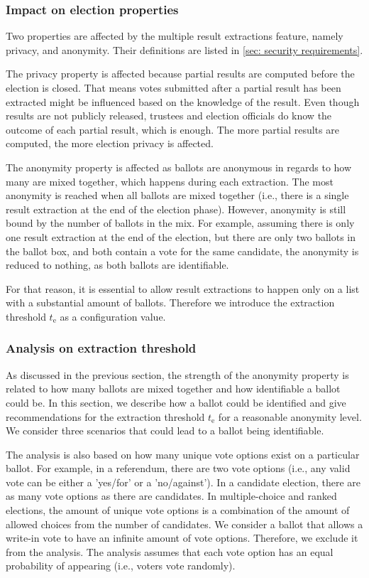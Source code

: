 \subsubsection{Impact on election properties}
Two properties are affected by the multiple result extractions feature, namely privacy, and anonymity. Their definitions are listed in \cref{sec: security requirements}.

The privacy property is affected because partial results are computed before the election is closed. That means votes submitted after a partial result has been extracted might be influenced based on the knowledge of the result. Even though results are not publicly released, trustees and election officials do know the outcome of each partial result, which is enough. The more partial results are computed, the more election privacy is affected.

The anonymity property is affected as ballots are anonymous in regards to how many are mixed together, which happens during each extraction. The most anonymity is reached when all ballots are mixed together (i.e., there is a single result extraction at the end of the election phase). However, anonymity is still bound by the number of ballots in the mix. For example, assuming there is only one result extraction at the end of the election, but there are only two ballots in the ballot box, and both contain a vote for the same candidate, the anonymity is reduced to nothing, as both ballots are identifiable.

For that reason, it is essential to allow result extractions to happen only on a list with a substantial amount of ballots. Therefore we introduce the extraction threshold $t_\mathrm{e}$ as a configuration value.


\subsubsection{Analysis on extraction threshold}
As discussed in the previous section, the strength of the anonymity property is related to how many ballots are mixed together and how identifiable a ballot could be. In this section, we describe how a ballot could be identified and give recommendations for the extraction threshold $t_\mathrm{e}$ for a reasonable anonymity level. We consider three scenarios that could lead to a ballot being identifiable.

The analysis is also based on how many unique vote options exist on a particular ballot. For example, in a referendum, there are two vote options (i.e., any valid vote can be either a 'yes/for' or a 'no/against'). In a candidate election, there are as many vote options as there are candidates. In multiple-choice and ranked elections, the amount of unique vote options is a combination of the amount of allowed choices from the number of candidates. We consider a ballot that allows a write-in vote to have an infinite amount of vote options. Therefore, we exclude it from the analysis. The analysis assumes that each vote option has an equal probability of appearing (i.e., voters vote randomly).

